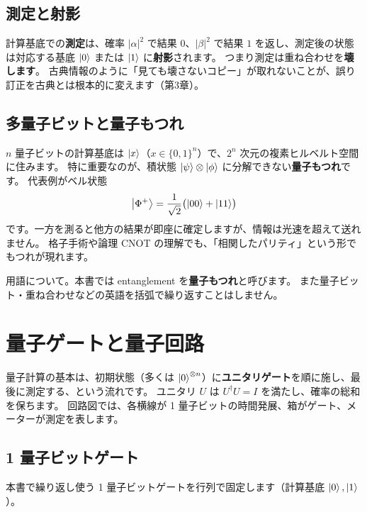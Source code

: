 \subsection{測定と射影}

計算基底での\textbf{測定}は、確率 $|\alpha|^2$ で結果 $0$、$|\beta|^2$ で結果 $1$ を返し、測定後の状態は対応する基底 $\ket{0}$ または $\ket{1}$ に\textbf{射影}されます。
つまり測定は重ね合わせを\textbf{壊します}。
古典情報のように「見ても壊さないコピー」が取れないことが、誤り訂正を古典とは根本的に変えます（第3章）。

\subsection{多量子ビットと量子もつれ}

$n$ 量子ビットの計算基底は $\ket{x}$（$x\in\{0,1\}^n$）で、$2^n$ 次元の複素ヒルベルト空間に住みます。
特に重要なのが、積状態 $\ket{\psi}\otimes\ket{\phi}$ に分解できない\textbf{量子もつれ}です。
代表例がベル状態
\begin{equation}
  \ket{\Phi^+}
  = \frac{1}{\sqrt{2}}\bigl(\ket{00}+\ket{11}\bigr)
\end{equation}
です。一方を測ると他方の結果が即座に確定しますが、情報は光速を超えて送れません。
格子手術や論理 CNOT の理解でも、「相関したパリティ」という形でもつれが現れます。

\begin{notebox}
  用語について。本書では entanglement を\textbf{量子もつれ}と呼びます。
  また量子ビット・重ね合わせなどの英語を括弧で繰り返すことはしません。
\end{notebox}

\section{量子ゲートと量子回路}\label{sec:gates}

量子計算の基本は、初期状態（多くは $\ket{0}^{\otimes n}$）に\textbf{ユニタリゲート}を順に施し、最後に測定する、という流れです。
ユニタリ $U$ は $U^\dagger U = I$ を満たし、確率の総和を保ちます。
回路図では、各横線が 1 量子ビットの時間発展、箱がゲート、メーターが測定を表します。

\subsection{1 量子ビットゲート}

本書で繰り返し使う 1 量子ビットゲートを行列で固定します（計算基底 $\ket{0},\ket{1}$）。

